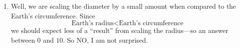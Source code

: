 \documentclass[noauthor,nooutcomes,handout]{ximera}
\begin{document}
\begin{question}
\begin{freeResponse}
\begin{enumerate}
    \item Well, we are scaling the diameter by a small amount when
      compared to the Earth's circumference. Since
      \[
      \text{Earth's radius} < \text{Earth's circumference}
      \]
      we should expect less of a ``result'' from scaling the
      radius---so an answer between $0$ and $10$. So NO, I am not
      surprised.
    \end{enumerate}
    \end{freeResponse}
    \end{question}
\end{document}

